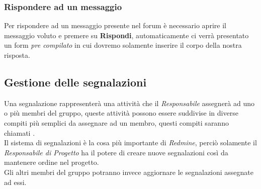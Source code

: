 \documentclass{scalatekids-article}
\begin{document}
\subsubsection{Rispondere ad un messaggio}
Per rispondere ad un messaggio presente nel forum è necessario aprire il messaggio voluto e premere su \textbf{Rispondi}, automaticamente ci verrà presentato un form \textit{pre compilato} in cui dovremo solamente inserire il corpo della nostra risposta.
\subsection{Gestione delle segnalazioni}
Una segnalazione rappresenterà una attività che il \textit{Responsabile} assegnerà ad uno o più membri del gruppo, queste attività possono essere suddivise in diverse compiti più semplici da assegnare ad un membro, questi compiti saranno chiamati .\\
Il sistema di segnalazioni è la cosa più importante di \textit{Redmine}, perciò solamente il \textit{Responsabile di Progetto} ha il potere di creare nuove segnalazioni così da mantenere ordine nel progetto. \\Gli altri membri del gruppo potranno invece aggiornare le segnalazioni assegnate ad essi.
\end{document}
